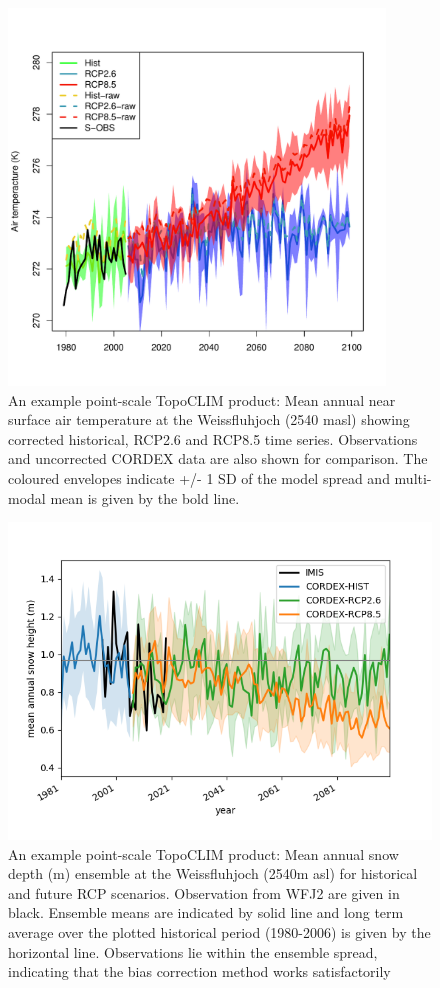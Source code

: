 \documentclass[hess, manuscript]{copernicus}
\begin{document}


\begin{figure}[t]
\includegraphics[width=10cm]{"plots/tasTS2.pdf"}
\caption{An example point-scale TopoCLIM product: Mean annual near surface air temperature at the Weissfluhjoch (2540 masl) showing corrected historical, RCP2.6 and RCP8.5 time series. Observations and uncorrected CORDEX data are also shown for comparison. The coloured envelopes indicate +/- 1 SD of the model spread and multi-modal mean is given by the bold line. }
\end{figure}



\begin{figure}[t]
\includegraphics[width=12cm]{"plots/wfj_snow_TS2.png"}
\caption{An example point-scale TopoCLIM product: Mean annual snow depth (m) ensemble at the Weissfluhjoch (2540m asl) for historical and future RCP scenarios. Observation from WFJ2 are given in black. Ensemble means are indicated by solid line and long term average over the plotted historical period (1980-2006) is given by the horizontal line. Observations lie within the ensemble spread, indicating that the bias correction method works satisfactorily }
\end{figure}
\end{document}
